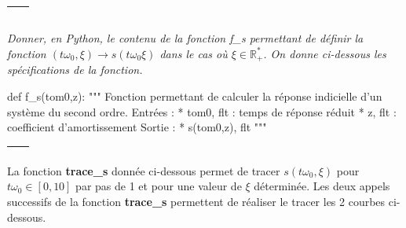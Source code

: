 \documentclass[10pt]{article}
\newif\ifprof
\begin{document}
\begin{tabular}{|p{}|}
\hline
$$\quad$$
\vspace{1cm}
$$\quad$$ \\
\hline
\end{tabular}
\fi

\subparagraph{} \textit{Donner, en Python, le contenu de la fonction \textsf{f\_s} permettant de définir la fonction $(t\omega_0,\xi) \rightarrow s(t\omega_0\xi)$ dans le cas où $\xi\in \mathbb{R}_+^*$. On donne ci-dessous les spécifications de la fonction.}
\ifprof
\else
\begin{py}
\begin{python}
def f_s(tom0,z):
    """
    Fonction permettant de calculer la réponse indicielle d'un système du second ordre. 
    Entrées : 
        * tom0, flt : temps de réponse réduit
        * z, flt : coefficient d'amortissement
    Sortie : 
        * s(tom0,z), flt
    """
\end{python}
\end{py}
\fi

\ifprof
\begin{corrige}
\begin{py}
\begin{python}
def f_s(tom0,z) :
    """
    Fonction permettant de calculer la réponse indicielle d'un système du second ordre. 
    Entrées : 
        * tom0, flt : temps de réponse réduit
        * z, flt : coefficient d'amortissement
    Sortie : 
        * s(tom0,z), flt
    """
    if z<0 :
        return None
    elif z<1 :
        return f2_pseudo(tom0,z)
    elif z==1:
        return f2_critique(tom0)
    else : 
        return f2_aperiodique(tom0,z)
\end{python}
\end{py}
\end{corrige}
\else

\begin{tabular}{|p{}|}
\hline
$$\quad$$
\vspace{2cm}
$$\quad$$ \\
\hline
\end{tabular}
\fi

\ifprof
\else

\newpage 

La fonction \textbf{\textsf{trace\_s}} donnée ci-dessous permet de tracer $s(t\omega_0,\xi)$ pour $t\omega_0 \in [0,10]$ par pas de 1 et pour une valeur de $\xi$ déterminée. Les deux appels successifs de la fonction \textbf{\textsf{trace\_s}} permettent de réaliser le tracer les 2 courbes ci-dessous.
\end{document}
